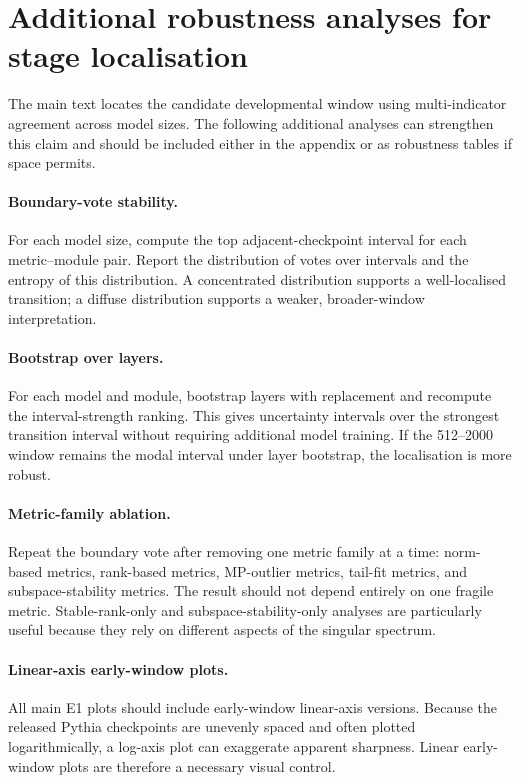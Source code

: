 \section{Additional robustness analyses for stage localisation}
\label{app:stage_localisation_robustness}

The main text locates the candidate developmental window using multi-indicator agreement across model sizes. The following additional analyses can strengthen this claim and should be included either in the appendix or as robustness tables if space permits.

\paragraph{Boundary-vote stability.}
For each model size, compute the top adjacent-checkpoint interval for each metric--module pair. Report the distribution of votes over intervals and the entropy of this distribution. A concentrated distribution supports a well-localised transition; a diffuse distribution supports a weaker, broader-window interpretation.

\paragraph{Bootstrap over layers.}
For each model and module, bootstrap layers with replacement and recompute the interval-strength ranking. This gives uncertainty intervals over the strongest transition interval without requiring additional model training. If the 512--2000 window remains the modal interval under layer bootstrap, the localisation is more robust.

\paragraph{Metric-family ablation.}
Repeat the boundary vote after removing one metric family at a time: norm-based metrics, rank-based metrics, MP-outlier metrics, tail-fit metrics, and subspace-stability metrics. The result should not depend entirely on one fragile metric. Stable-rank-only and subspace-stability-only analyses are particularly useful because they rely on different aspects of the singular spectrum.

\paragraph{Linear-axis early-window plots.}
All main E1 plots should include early-window linear-axis versions. Because the released Pythia checkpoints are unevenly spaced and often plotted logarithmically, a log-axis plot can exaggerate apparent sharpness. Linear early-window plots are therefore a necessary visual control.

